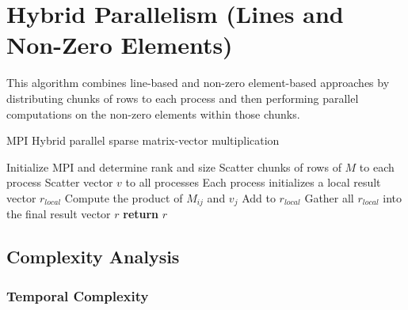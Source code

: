\documentclass[12pt,oneside]{book} %
\begin{document}
\newpage
\section{Hybrid Parallelism (Lines and Non-Zero Elements)}
This algorithm combines line-based and non-zero element-based approaches by
distributing chunks of rows to each process and then performing parallel
computations on the non-zero elements within those chunks.

\begin{algorithm}[H]
    \caption{MPI Hybrid parallel sparse matrix-vector multiplication}
    \begin{algorithmic}[1]
        \State Initialize MPI and determine rank and size
        \State Scatter chunks of rows of $M$ to each process
        \State Scatter vector $v$ to all processes
        \State Each process initializes a local result vector $r_{local}$
        \State Compute the product of $M_{ij}$ and $v_j$
        \State Add to $r_{local}$
        \EndFor
        \EndFor
        \State Gather all $r_{local}$ into the final result vector $r$
        \State \textbf{return} $r$
        \EndProcedure
    \end{algorithmic}
\end{algorithm}

\subsection{Complexity Analysis}
\subsubsection{Temporal Complexity}
\end{document}
